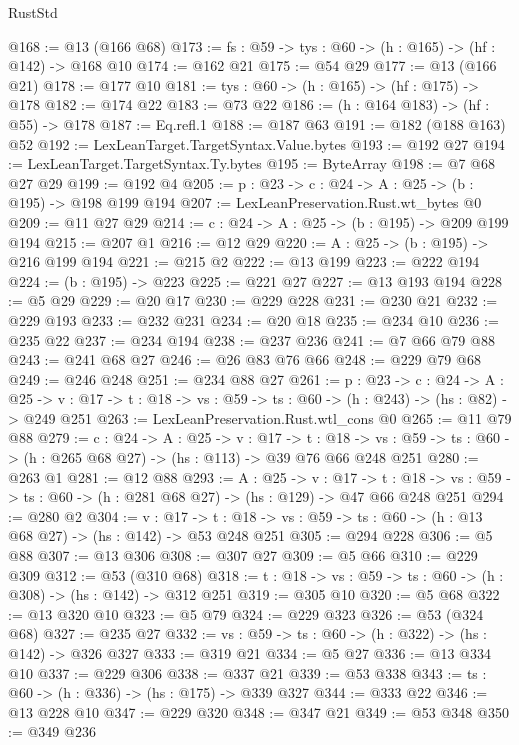 \begin{lexlean}{RustStd}
\begin{coremodule}
@168 := @13 (@166 @68)
@173 := {fs : @59} -> {tys : @60} -> (h : @165) -> (hf : @142) -> @168 @10
@174 := @162 @21
@175 := @54 @29
@177 := @13 (@166 @21)
@178 := @177 @10
@181 := {tys : @60} -> (h : @165) -> (hf : @175) -> @178
@182 := @174 @22
@183 := @73 @22
@186 := (h : @164 @183) -> (hf : @55) -> @178
@187 := Eq.refl.{1}
@188 := @187 @63
@191 := @182 (@188 @163) @52
@192 := LexLeanTarget.TargetSyntax.Value.bytes
@193 := @192 @27
@194 := LexLeanTarget.TargetSyntax.Ty.bytes
@195 := ByteArray
@198 := @7 @68 @27 @29
@199 := @192 @4
@205 := {p : @23} -> {c : @24} -> {A : @25} -> (b : @195) -> @198 @199 @194
@207 := LexLeanPreservation.Rust.wt_bytes @0
@209 := @11 @27 @29
@214 := {c : @24} -> {A : @25} -> (b : @195) -> @209 @199 @194
@215 := @207 @1
@216 := @12 @29
@220 := {A : @25} -> (b : @195) -> @216 @199 @194
@221 := @215 @2
@222 := @13 @199
@223 := @222 @194
@224 := (b : @195) -> @223
@225 := @221 @27
@227 := @13 @193 @194
@228 := @5 @29
@229 := @20 @17
@230 := @229 @228
@231 := @230 @21
@232 := @229 @193
@233 := @232 @231
@234 := @20 @18
@235 := @234 @10
@236 := @235 @22
@237 := @234 @194
@238 := @237 @236
@241 := @7 @66 @79 @88
@243 := @241 @68 @27
@246 := @26 @83 @76 @66
@248 := @229 @79 @68
@249 := @246 @248
@251 := @234 @88 @27
@261 := {p : @23} ->
  {c : @24} ->
  {A : @25} ->
  {v : @17} -> {t : @18} -> {vs : @59} -> {ts : @60} -> (h : @243) -> (hs : @82) -> @249 @251
@263 := LexLeanPreservation.Rust.wtl_cons @0
@265 := @11 @79 @88
@279 := {c : @24} ->
  {A : @25} ->
  {v : @17} ->
  {t : @18} ->
  {vs : @59} -> {ts : @60} -> (h : @265 @68 @27) -> (hs : @113) -> @39 @76 @66 @248 @251
@280 := @263 @1
@281 := @12 @88
@293 := {A : @25} ->
  {v : @17} ->
  {t : @18} -> {vs : @59} -> {ts : @60} -> (h : @281 @68 @27) -> (hs : @129) -> @47 @66 @248 @251
@294 := @280 @2
@304 := {v : @17} ->
  {t : @18} -> {vs : @59} -> {ts : @60} -> (h : @13 @68 @27) -> (hs : @142) -> @53 @248 @251
@305 := @294 @228
@306 := @5 @88
@307 := @13 @306
@308 := @307 @27
@309 := @5 @66
@310 := @229 @309
@312 := @53 (@310 @68)
@318 := {t : @18} -> {vs : @59} -> {ts : @60} -> (h : @308) -> (hs : @142) -> @312 @251
@319 := @305 @10
@320 := @5 @68
@322 := @13 @320 @10
@323 := @5 @79
@324 := @229 @323
@326 := @53 (@324 @68)
@327 := @235 @27
@332 := {vs : @59} -> {ts : @60} -> (h : @322) -> (hs : @142) -> @326 @327
@333 := @319 @21
@334 := @5 @27
@336 := @13 @334 @10
@337 := @229 @306
@338 := @337 @21
@339 := @53 @338
@343 := {ts : @60} -> (h : @336) -> (hs : @175) -> @339 @327
@344 := @333 @22
@346 := @13 @228 @10
@347 := @229 @320
@348 := @347 @21
@349 := @53 @348
@350 := @349 @236

\end{coremodule}
\end{lexlean}
